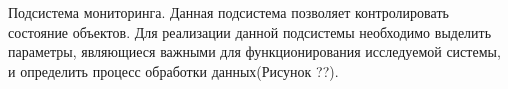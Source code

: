     Подсистема мониторинга. Данная подсистема позволяет контролировать состояние объектов. Для реализации данной подсистемы необходимо выделить параметры, являющиеся важными для функционирования исследуемой системы, и определить процесс обработки данных(Рисунок ??).



